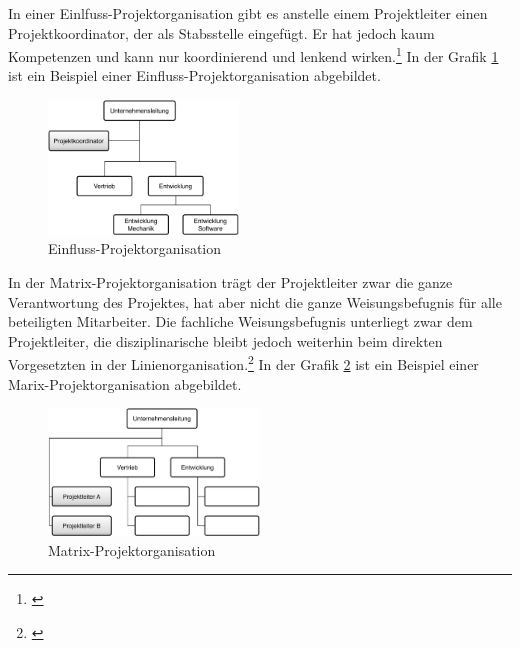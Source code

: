 In einer Einlfuss-Projektorganisation gibt es anstelle einem Projektleiter
einen Projektkoordinator, der als Stabsstelle eingefügt. Er hat jedoch kaum
Kompetenzen und kann nur koordinierend und lenkend wirken.\footnote{\citealp*[Vgl.][S. 57]{burghardt2007einfuehrung}}
In der Grafik \ref{pic:05_projektorganisationen_einfluss}
ist ein Beispiel einer Einfluss-Projektorganisation abgebildet.

\clearpage

\begin{figure}[htbp]
\begin{center}
\includegraphics[width=0.45\textwidth,angle=0]{./bilder/theorie/05_projektorganisationen_einfluss.pdf}
\caption[Einfluss-Projektorganisation]{Einfluss-Projektorganisation\footnotemark}
\label{pic:05_projektorganisationen_einfluss}
\end{center}
\end{figure}

In der Matrix-Projektorganisation trägt der Projektleiter zwar die ganze Verantwortung
des Projektes, hat aber nicht die ganze Weisungsbefugnis für alle beteiligten Mitarbeiter.
Die fachliche Weisungsbefugnis unterliegt zwar dem Projektleiter, die disziplinarische
bleibt jedoch weiterhin beim direkten Vorgesetzten in der Linienorganisation.\footnote{\citealp*[Vgl.][S. 58]{burghardt2007einfuehrung}}
In der Grafik \ref{pic:05_projektorganisationen_matrix} ist ein Beispiel einer 
Marix-Projektorganisation abgebildet.

\begin{figure}[htbp]
\begin{center}
\includegraphics[width=0.5\textwidth,angle=0]{./bilder/theorie/05_projektorganisationen_matrix.pdf}
\caption[Matrix-Projektorganisation]{Matrix-Projektorganisation\footnotemark}
\label{pic:05_projektorganisationen_matrix}
\end{center}
\end{figure}

